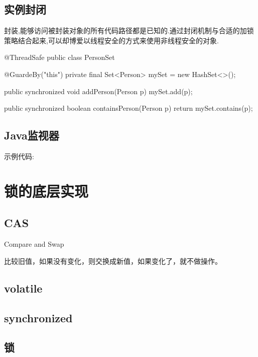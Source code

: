 \subsection{实例封闭}

封装,能够访问被封装对象的所有代码路径都是已知的.通过封闭机制与合适的加锁策略结合起来,可以却博爱以线程安全的方式来使用非线程安全的对象.

\begin{Java}
@ThreadSafe
public class PersonSet {

	@GuardeBy("this")
	private final Set<Person> mySet = new HashSet<>();
	
	public synchronized void addPerson(Person p)
	{
		mySet.add(p);
	}
	
	public synchronized boolean containsPerson(Person p)
	{
		return mySet.contains(p);
	}
}
\end{Java}


\subsection{Java监视器}


示例代码:



\section{锁的底层实现}

\subsection{CAS}

Compare and Swap

比较旧值，如果没有变化，则交换成新值，如果变化了，就不做操作。

\subsection{volatile}

\subsection{synchronized}

\subsection{锁}











